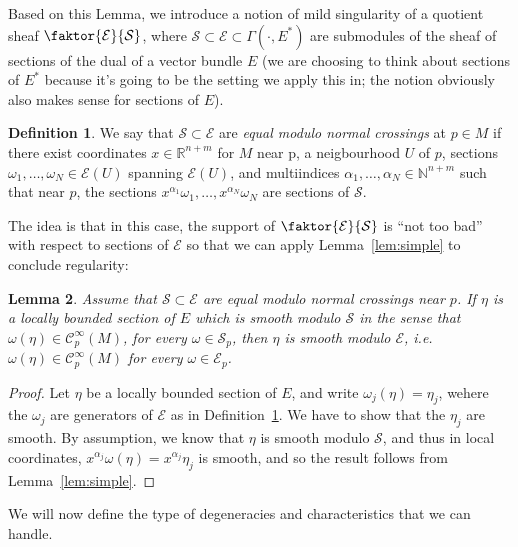 \documentclass[11pt]{amsart}
\newcommand{\R}{\mathbb{R}}
\newcommand{\N}{\mathbb{N}}
\newcommand{\cinfty}{\mathcal{C}^\infty}
\newcommand{\ssheaf}{\mathcal{S}}
\newcommand{\esheaf}{\mathcal{E}}
\theoremstyle{definition}
\newtheorem{defn}{Definition}[section]
\theoremstyle{remark}
\theoremstyle{plain}
\newtheorem{lem}[defn]{Lemma}
\begin{document}
  Based on this Lemma, we introduce a notion of mild singularity of a quotient sheaf $\faktor{ \esheaf}{\ssheaf}$, where
  $\ssheaf\subset\esheaf\subset \Gamma (\cdot, E^*)$ are submodules of the sheaf of sections
  of the dual of a  vector bundle $E$ (we are choosing to think about sections of $E^*$ because it's going to be the setting
  we apply this in; the notion obviously also makes sense for sections of $E$). 
  
   \begin{defn}\label{def:normalcrossingsgen}
    We say that $\ssheaf \subset \esheaf$  are   {\em equal modulo normal crossings} at $p\in M$ if there
    exist coordinates $x \in \R^{n+m}$ for $M$ near p, a neigbourhood $U$ of $p$, 
    sections $\omega_1 , \dots , \omega_{N}  \in \esheaf (U)  $ spanning $\esheaf (U)$, and multiindices $\alpha_1, \dots, \alpha_N
    \in \N^{n+m}$  such that near $p$,  
    the sections $x^{\alpha_1} {\omega_1}, \dots, x^{\alpha_N} {\omega_N}$ are sections
    of $\ssheaf$. 
  \end{defn}
  The idea is  that in this case, the support of $\faktor{\esheaf}{\ssheaf}$ is
  ``not too bad'' with respect to sections of $\esheaf$  so that
  we can apply Lemma~\ref{lem:simple} to conclude regularity:

  \begin{lem}\label{lem:smoothness} Assume that $\ssheaf \subset \esheaf$ are equal modulo normal crossings near $p$. If $\eta$ is a locally bounded section
    of $E$ which  
    is smooth modulo $\ssheaf$ in the sense that $ \omega (\eta) \in \cinfty_p(M)$, for every $\omega \in \ssheaf_p$,  then $\eta$ is smooth modulo
    $\esheaf$, i.e. $\omega(\eta) \in \cinfty_p (M)$ for every $\omega \in \esheaf_p$. 
  \end{lem}


     \begin{proof}
       Let $\eta$ be a locally bounded section of $E$, and write $\omega_j (\eta) = \eta_j$, wehere the $\omega_j$ are generators of $\esheaf$
       as in Definition~\ref{def:normalcrossingsgen}.
       We have
    to show that the $\eta_j$ are smooth. By assumption, we know that
    $\eta$ is smooth modulo $\ssheaf$, and thus in local coordinates, $x^{\alpha_j} \omega (\eta) = x^{\alpha_j} \eta_j$ is smooth, and so
    the result follows from Lemma~\ref{lem:simple}.
  \end{proof}

  We will now define the type of degeneracies and characteristics that we can handle. 
\end{document}
